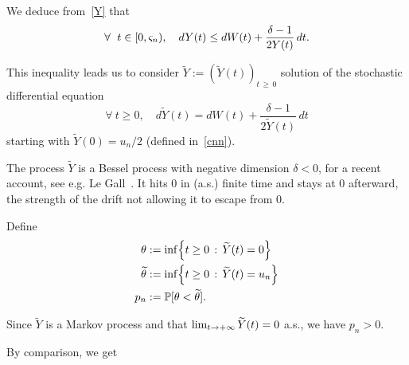 \documentclass[10pt]{amsart}
\theoremstyle{definition}\newtheorem{defi}[theo]{Definition}\newtheorem{rema}[theo]{Remark}\newtheorem{exam}[theo]{Example}\newtheorem{exem}[theo]{Example}\newtheorem{nota}[theo]{Notation}
\newcommand{\f}[2]{\frac{#1}{#2}}
\newcommand{\PP}{\mathbb{P}}
\newcommand{\iy}{\infty}
\newcommand{\wi}{\widetilde}
\newcommand{\fo}{\forall\ }
\let\originalleft\left
\let\originalright\right
\renewcommand{\left}{\mathopen{}\mathclose\bgroup\originalleft}
\renewcommand{\right}{\aftergroup\egroup\originalright}
\let\oldin\in
\renewcommand{\in}{\mathchoice{\oldin}{\oldin}{\,\oldin\,}{\,\oldin\,}}
\renewcommand*{\to}{\mathchoice{\longrightarrow}{\rightarrow}{\rightarrow}{\rightarrow}}
\let\oldforall\forall
\renewcommand*{\forall}{\mathrel{\oldforall}}
\begin{document}
We deduce from~\eqref{Y} that
\begin{equation}\label{dYleq}
\fo t\in[0,\varsigma_n),\quad dY(t) \leq dW(t)+\f{\delta-1}{2Y(t)}\,dt.
\end{equation}


This inequality leads us to consider $\wi Y:=(\wi Y(t))_{t\,\geq\,0}$ solution of the stochastic differential equation
\begin{equation}\label{wiY}
\fo t\geq 0,\quad d\wi Y(t) = dW(t)+\f{\delta-1}{2\wi Y(t)}\,dt
\end{equation}
starting with $\wi Y(0)=u_n/2$ (defined in~\eqref{cnn}).

The process $\wi Y$ is a Bessel process with negative dimension $\delta<0$, for a recent account, see e.g. Le Gall~\cite{zbMATH06567615}. It hits 0 in (a.s.) finite time and stays at 0 afterward, the strength of the drift not allowing it to escape from 0.


Define
\begin{equation}\label{pn}
\begin{split}
\theta &:= \inf\left\{t\geq 0\,:\, \wi Y(t)=0\right\}\\
\wi \theta &:= \inf\left\{t\geq 0\,:\, \wi Y(t)=u_n\right\}
\\
p_n &:= \PP[\theta <\wi\theta].
\end{split}
\end{equation}


Since $\wi Y$ is a Markov process and that $\lim_{t\to +\iy}\wi Y(t)=0$ a.s., we have $p_n>0$.


By comparison, we get
\end{document}
